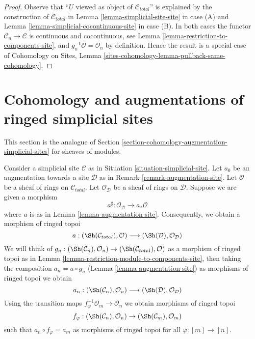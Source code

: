 \begin{proof}
Observe that ``$U$ viewed as object of $\mathcal{C}_{total}$''
is explained by the construction of $\mathcal{C}_{total}$ in
Lemma \ref{lemma-simplicial-site-site} in case (A) and
Lemma \ref{lemma-simplicial-cocontinuous-site} in case (B).
In both cases the functor $\mathcal{C}_n \to \mathcal{C}$
is continuous and cocontinuous, see
Lemma \ref{lemma-restriction-to-components-site}, and
$g_n^{-1}\mathcal{O} = \mathcal{O}_n$ by definition.
Hence the result is a special case of
Cohomology on Sites, Lemma
\ref{sites-cohomology-lemma-pullback-same-cohomology}.
\end{proof}






\section{Cohomology and augmentations of ringed simplicial sites}
\label{section-cohomology-augmentation-ringed-simplicial-sites}

\noindent
This section is the analogue of
Section \ref{section-cohomology-augmentation-simplicial-sites}
for sheaves of modules.

\medskip\noindent
Consider a simplicial site $\mathcal{C}$ as in
Situation \ref{situation-simplicial-site}.
Let $a_0$ be an augmentation towards a site $\mathcal{D}$ as in
Remark \ref{remark-augmentation-site}.
Let $\mathcal{O}$ be a sheaf of rings on $\mathcal{C}_{total}$.
Let $\mathcal{O}_\mathcal{D}$ be a sheaf of rings on $\mathcal{D}$.
Suppose we are given a morphism
$$
a^\sharp : \mathcal{O}_\mathcal{D} \longrightarrow a_*\mathcal{O}
$$
where $a$ is as in Lemma \ref{lemma-augmentation-site}.
Consequently, we obtain a morphism of ringed topoi
$$
a :
(\Sh(\mathcal{C}_{total}), \mathcal{O})
\longrightarrow
(\Sh(\mathcal{D}), \mathcal{O}_\mathcal{D})
$$
We will think of $g_n : (\Sh(\mathcal{C}_n), \mathcal{O}_n) \to
(\Sh(\mathcal{C}_{total}), \mathcal{O})$ as a morphism of ringed topoi
as in
Lemma \ref{lemma-restriction-module-to-components-site}, then
taking the composition $a_n = a \circ g_n$
(Lemma \ref{lemma-augmentation-site})
as morphisms of ringed topoi we obtain
$$
a_n :
(\Sh(\mathcal{C}_n), \mathcal{O}_n)
\longrightarrow
(\Sh(\mathcal{D}), \mathcal{O}_\mathcal{D})
$$
Using the transition maps $f_\varphi^{-1}\mathcal{O}_m \to \mathcal{O}_n$
we obtain morphisms of ringed topoi
$$
f_\varphi : (\Sh(\mathcal{C}_n), \mathcal{O}_n) \to
(\Sh(\mathcal{C}_m), \mathcal{O}_m)
$$
such that $a_n \circ f_\varphi = a_m$ as morphisms of
ringed topoi for all $\varphi : [m] \to [n]$.


